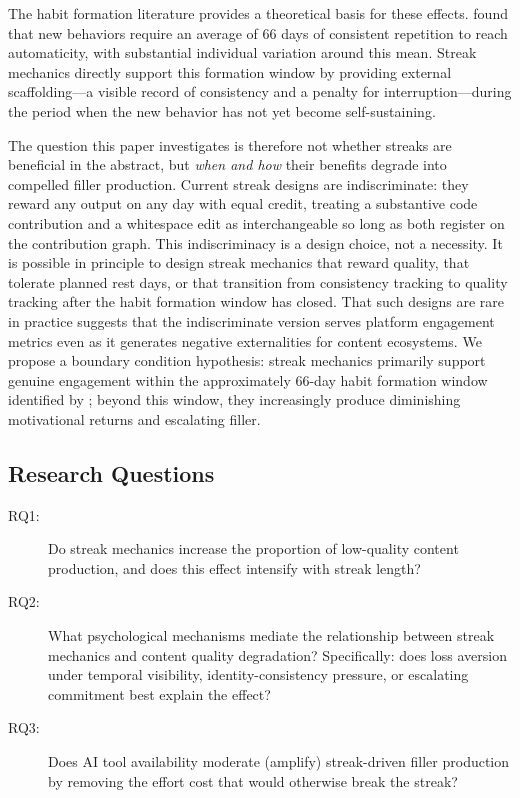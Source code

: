 \documentclass[12pt]{article}
\begin{document}
The habit formation literature provides a theoretical basis for these effects. \citet{Lally2010} found that new behaviors require an average of 66 days of consistent repetition to reach automaticity, with substantial individual variation around this mean. Streak mechanics directly support this formation window by providing external scaffolding---a visible record of consistency and a penalty for interruption---during the period when the new behavior has not yet become self-sustaining.

The question this paper investigates is therefore not whether streaks are beneficial in the abstract, but \emph{when and how} their benefits degrade into compelled filler production. Current streak designs are indiscriminate: they reward any output on any day with equal credit, treating a substantive code contribution and a whitespace edit as interchangeable so long as both register on the contribution graph. This indiscriminacy is a design choice, not a necessity. It is possible in principle to design streak mechanics that reward quality, that tolerate planned rest days, or that transition from consistency tracking to quality tracking after the habit formation window has closed. That such designs are rare in practice suggests that the indiscriminate version serves platform engagement metrics even as it generates negative externalities for content ecosystems. We propose a boundary condition hypothesis: streak mechanics primarily support genuine engagement within the approximately 66-day habit formation window identified by \citet{Lally2010}; beyond this window, they increasingly produce diminishing motivational returns and escalating filler.

\subsection{Research Questions}
\label{sec:research-questions}

\begin{description}
    \item[RQ1:] Do streak mechanics increase the proportion of low-quality content production, and does this effect intensify with streak length?
    \item[RQ2:] What psychological mechanisms mediate the relationship between streak mechanics and content quality degradation? Specifically: does loss aversion under temporal visibility, identity-consistency pressure, or escalating commitment best explain the effect?
    \item[RQ3:] Does AI tool availability moderate (amplify) streak-driven filler production by removing the effort cost that would otherwise break the streak?
\end{description}
\end{document}
